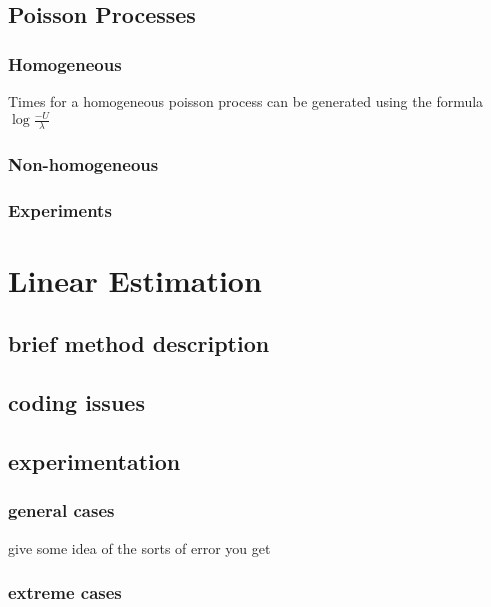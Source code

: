 \documentclass[11pt]{article}
\begin{document}
\subsection{Poisson Processes}
\label{sec-3.1}

\subsubsection{Homogeneous}
\label{sec-3.1.1}

    Times for a homogeneous poisson process can be generated using the formula $\log\frac{-U}{\lambda}$
\subsubsection{Non-homogeneous}
\label{sec-3.1.2}

\subsubsection{Experiments}
\label{sec-3.1.3}

\section{Linear Estimation}
\label{sec-4}

\subsection{brief method description}
\label{sec-4.1}

\subsection{coding issues}
\label{sec-4.2}

\subsection{experimentation}
\label{sec-4.3}

\subsubsection{general cases}
\label{sec-4.3.1}

    give some idea of the sorts of error you get 
\subsubsection{extreme cases}
\label{sec-4.3.2}
\end{document}
